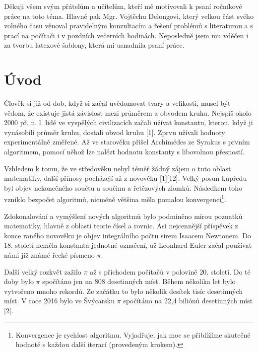 \documentclass[soc]{gzwroc} %
\begin{document}
\titulnistrana %
\prohlaseni %
\podekovani %
Děkuji všem svým přátelům a učitelům, kteří mě motivovali k psaní ročníkové práce na toto téma. Hlavně pak Mgr. Vojtěchu Delongovi, který velkou část svého volného času věnoval pravidelným konzultacím a řešení problémů s literaturou a s prací na počítači i v pozdních večerních hodinách. Neposledně jsem mu vděčen i za tvorbu latexové šablony, která mi usnadnila psaní práce.
\newpage %
\vyrobanotaci %
\tableofcontents %
\newpage %
\section{Úvod} %
Člověk si již od dob, když si začal uvědomovat tvary a velikosti, musel být vědom, že existuje jistá závislost mezi průměrem a obvodem kruhu. Nejspíš okolo 2000 př. n. l. lidé ve vyspělých civilizacích začali užívat konstantu, kterou, když ji vynásobili průměr kruhu, dostali obvod kruhu [1].
Zprvu užívali hodnoty experimentálně změřené. Až ve starověku přišel Archimédes ze Syrakus s prvním algoritmem, pomocí něhož lze nalézt hodnotu konstanty s libovolnou přesností.

Vzhledem k tomu, že ve středověku nebyl téměř žádný zájem o tuto oblast matematiky, další přínosy pocházejí až z novověku [1][12]. Velký posun kupředu byl objev nekonečného součtu a součinu a řetězových zlomků. Následkem toho vzniklo bezpočet algoritmů, nicméně většina měla pomalou konvergenci\footnote[1]{Konvergence je rychlost algoritmu. Vyjadřuje, jak moc se přiblížíme skutečné hodnotě s každou další iterací (provedeným krokem).}.

Zdokonalování a vymýšlení nových algoritmů bylo podmíněno mírou poznatků matematiky, hlavně z oblasti teorie čísel a rovnic. Asi nejcennější příspěvek z konce raného novověku je objev integrálního počtu sirem Isaacem Newtonem. Do 18. století neměla konstanta jednotné označení, až Leonhard Euler začal používat námi již známé řecké písmeno $\pi$.

Další velký rozkvět zažilo $\pi$ až s příchodem počítačů v polovině 20. století. Do té doby bylo $\pi$ spočítáno jen na 808 desetinných míst. Během několika let bylo vytvořeno mnoho rekordů. Ze začátku to bylo několik desítek tisíc desetinných míst. V roce 2016 bylo ve Švýcarsku $\pi$ spočítáno na 22,4 biliónů desetinných míst [2].
\end{document}
